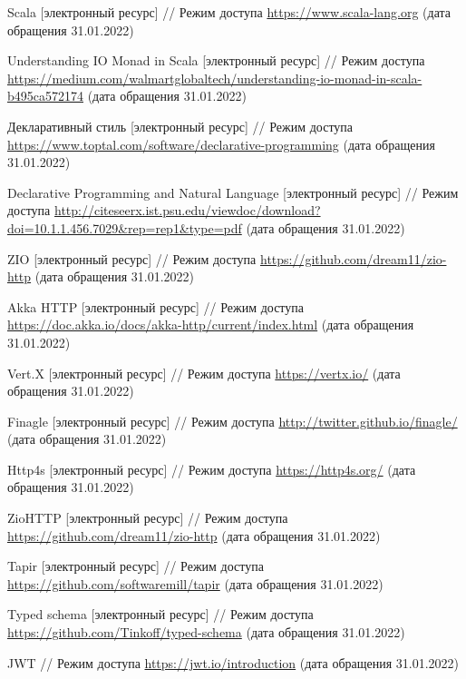 \documentclass[14pt]{extarticle}
\begin{document}
    \begin{thebibliography}{99}
        Scala [электронный ресурс] // Режим доступа \url{https://www.scala-lang.org} (дата обращения 31.01.2022)

        Understanding IO Monad in Scala [электронный ресурс] // Режим доступа
        \url{https://medium.com/walmartglobaltech/understanding-io-monad-in-scala-b495ca572174}
        (дата обращения 31.01.2022)

        Декларативный стиль [электронный ресурс] // Режим доступа \url{https://www.toptal.com/software/declarative-programming}
        (дата обращения 31.01.2022)

        Declarative Programming and Natural Language [электронный ресурс] // Режим доступа  \url{http://citeseerx.ist.psu.edu/viewdoc/download?doi=10.1.1.456.7029&rep=rep1&type=pdf}
        (дата обращения 31.01.2022)

        ZIO [электронный ресурс] // Режим доступа \url{https://github.com/dream11/zio-http} (дата обращения 31.01.2022)

        Akka HTTP [электронный ресурс] // Режим доступа \url{https://doc.akka.io/docs/akka-http/current/index.html} (дата обращения 31.01.2022)

        Vert.X [электронный ресурс] // Режим доступа \url{https://vertx.io/} (дата обращения 31.01.2022)

        Finagle [электронный ресурс] // Режим доступа \url{http://twitter.github.io/finagle/} (дата обращения 31.01.2022)

        Http4s [электронный ресурс] // Режим доступа \url{https://http4s.org/} (дата обращения 31.01.2022)

        ZioHTTP [электронный ресурс] // Режим доступа \url{https://github.com/dream11/zio-http} (дата обращения 31.01.2022)

        Tapir [электронный ресурс] // Режим доступа \url{https://github.com/softwaremill/tapir} (дата обращения 31.01.2022)

        Typed schema [электронный ресурс] // Режим доступа \url{https://github.com/Tinkoff/typed-schema} (дата обращения 31.01.2022)

        JWT // Режим доступа
        \url{https://jwt.io/introduction}
        (дата обращения 31.01.2022)

    \end{thebibliography}
\end{document}
